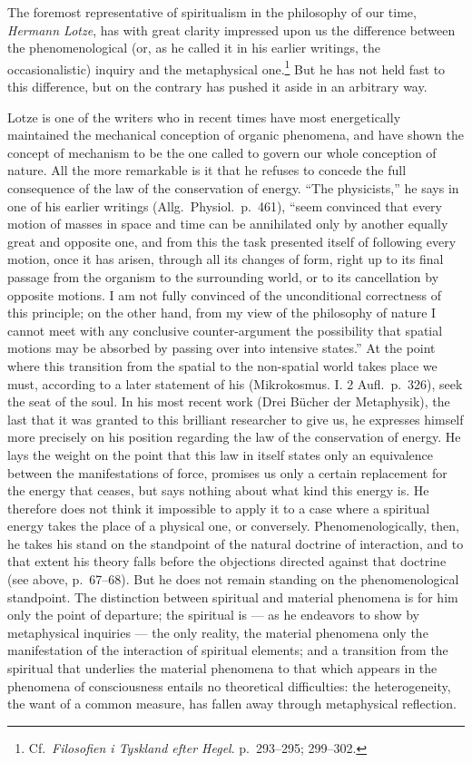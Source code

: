 \documentclass[12pt,a4paper]{book}
\newcommand{\opage}[1]{\marginnote{\footnotesize\textit{[#1]}}}
\begin{document}
The foremost representative of spiritualism in the philosophy of our
time, \emph{Hermann Lotze}, has with great clarity impressed upon us the
difference between the phenomenological (or, as he called it in his
earlier writings, the occasionalistic) inquiry and the metaphysical
one.\footnote{Cf.\ \textit{Filosofien i Tyskland efter Hegel}.
p.~293--295; 299--302.} But he has not held fast to this difference,
but on the contrary has pushed it aside in an arbitrary way.

Lotze is one of the writers who in recent times have most energetically
maintained the mechanical conception of organic phenomena, and have
shown the concept of mechanism to be the one called to govern our whole
conception of nature. All the more remarkable is it that he refuses to
concede the full consequence of the law of the conservation of energy.
``The physicists,'' he says in one of his earlier writings (Allg.\
Physiol.\ p.~461), ``seem convinced that every motion of masses in space
and time can be annihilated only by another equally great and opposite
one, and from this the task presented itself of following every motion,
once it has arisen, through all its changes of form, right up to its
final passage from the organism to the surrounding world, or to its
cancellation by opposite motions. I am not fully convinced of the
unconditional correctness of this principle; on the other hand, from my
view of the philosophy of nature I cannot meet with any conclusive
counter-argument the possibility that spatial motions may be absorbed by
passing over into intensive states.'' At the point where this transition
from the spatial to the non-spatial world takes place we must,
according to a later statement of his (Mikrokosmus. I. 2 Aufl.\
p.~326), seek the seat of the soul. In his most recent work (Drei
Bücher
\opage{76}der Metaphysik), the last that it was granted to this
brilliant researcher to give us, he expresses himself more precisely on
his position regarding the law of the conservation of energy. He lays
the weight on the point that this law in itself states only an
equivalence between the manifestations of force, promises us only a
certain replacement for the energy that ceases, but says nothing about
what kind this energy is. He therefore does not think it impossible to
apply it to a case where a spiritual energy takes the place of a
physical one, or conversely. Phenomenologically, then, he takes his
stand on the standpoint of the natural doctrine of interaction, and to
that extent his theory falls before the objections directed against
that doctrine (see above, p.~67--68). But he does not remain standing
on the phenomenological standpoint. The distinction between spiritual
and material phenomena is for him only the point of departure; the
spiritual is --- as he endeavors to show by metaphysical inquiries ---
the only reality, the material phenomena only the manifestation of the
interaction of spiritual elements; and a transition from the spiritual
that underlies the material phenomena to that which appears in the
phenomena of consciousness entails no theoretical difficulties: the
heterogeneity, the want of a common measure, has fallen away through
metaphysical reflection.
\end{document}
